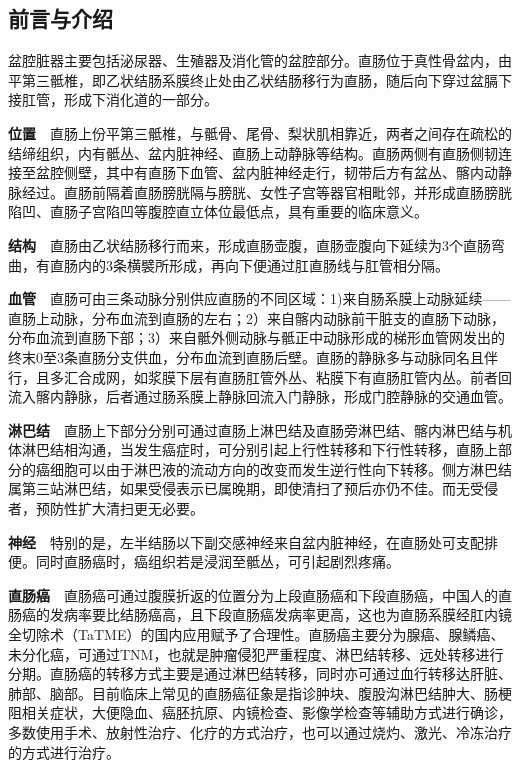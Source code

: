 \documentclass[a4paper,11pt,onecolumn,twoside]{article}
\begin{document}
\vspace{0.2cm}
\begin{multicols}{2}

    \section{前言与介绍}
    盆腔脏器主要包括泌尿器、生殖器及消化管的盆腔部分。直肠位于真性骨盆内，由平第三骶椎，即乙状结肠系膜终止处由乙状结肠移行为直肠，随后向下穿过盆膈下接肛管，形成下消化道的一部分。

    \noindent\textbf{位置}~~直肠上份平第三骶椎，与骶骨、尾骨、梨状肌相靠近，两者之间存在疏松的结缔组织，内有骶丛、盆内脏神经、直肠上动静脉等结构。直肠两侧有直肠侧韧连接至盆腔侧壁，其中有直肠下血管、盆内脏神经走行，韧带后方有盆丛、髂内动静脉经过。直肠前隔着直肠膀胱隔与膀胱、女性子宫等器官相毗邻，并形成直肠膀胱陷凹、直肠子宫陷凹等腹腔直立体位最低点，具有重要的临床意义。

    \noindent\textbf{结构}~~直肠由乙状结肠移行而来，形成直肠壶腹，直肠壶腹向下延续为3个直肠弯曲，有直肠内的3条横襞所形成，再向下便通过肛直肠线与肛管相分隔。

    \noindent\textbf{血管}~~直肠可由三条动脉分别供应直肠的不同区域：1)来自肠系膜上动脉延续——直肠上动脉，分布血流到直肠的左右；2）来自髂内动脉前干脏支的直肠下动脉，分布血流到直肠下部；3）来自骶外侧动脉与骶正中动脉形成的梯形血管网发出的终末0至3条直肠分支供血，分布血流到直肠后壁。直肠的静脉多与动脉同名且伴行，且多汇合成网，如浆膜下层有直肠肛管外丛、粘膜下有直肠肛管内丛。前者回流入髂内静脉，后者通过肠系膜上静脉回流入门静脉，形成门腔静脉的交通血管。

    \noindent\textbf{淋巴结}~~直肠上下部分分别可通过直肠上淋巴结及直肠旁淋巴结、髂内淋巴结与机体淋巴结相沟通，当发生癌症时，可分别引起上行性转移和下行性转移，直肠上部分的癌细胞可以由于淋巴液的流动方向的改变而发生逆行性向下转移。侧方淋巴结属第三站淋巴结，如果受侵表示已属晚期，即使清扫了预后亦仍不佳。而无受侵者，预防性扩大清扫更无必要\supercite{DIWEI}。

    \noindent\textbf{神经}~~特别的是，左半结肠以下副交感神经来自盆内脏神经，在直肠处可支配排便。同时直肠癌时，癌组织若是浸润至骶丛，可引起剧烈疼痛。

    \noindent\textbf{直肠癌}~~直肠癌可通过腹膜折返的位置分为上段直肠癌和下段直肠癌，中国人的直肠癌的发病率要比结肠癌高，且下段直肠癌发病率更高，这也为直肠系膜经肛内镜全切除术（TaTME）的国内应用赋予了合理性。直肠癌主要分为腺癌、腺鳞癌、未分化癌，可通过TNM，也就是肿瘤侵犯严重程度、淋巴结转移、远处转移进行分期。直肠癌的转移方式主要是通过淋巴结转移，同时亦可通过血行转移达肝脏、肺部、脑部。目前临床上常见的直肠癌征象是指诊肿块、腹股沟淋巴结肿大、肠梗阻相关症状，大便隐血、癌胚抗原、内镜检查、影像学检查等辅助方式进行确诊，多数使用手术、放射性治疗、化疗的方式治疗，也可以通过烧灼、激光、冷冻治疗的方式进行治疗。


\end{multicols}
\end{document}
